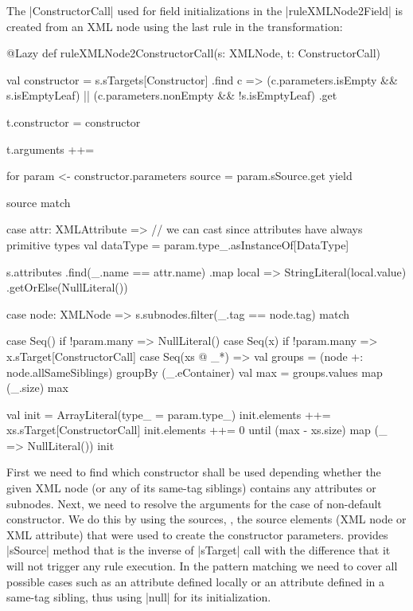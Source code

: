 The \Scala|ConstructorCall| used for field initializations in the \Scala|ruleXMLNode2Field| is created from an XML node using the last rule in the transformation:
%
\begin{scalacode}
@Lazy
def ruleXMLNode2ConstructorCall(s: XMLNode, t: ConstructorCall) {
  val constructor = s.sTargets[Constructor]
    .find { c =>
      (c.parameters.isEmpty && s.isEmptyLeaf) ||
      (c.parameters.nonEmpty && !s.isEmptyLeaf)
    }
    .get

  t.constructor = constructor

  t.arguments ++= {
    for {
      param <- constructor.parameters
      source = param.sSource.get
    } yield {
      source match {
        case attr: XMLAttribute =>
          // we can cast since attributes have always primitive types
          val dataType = param.type_.asInstanceOf[DataType]

          s.attributes
            .find(_.name == attr.name)
            .map { local => StringLiteral(local.value) }
            .getOrElse(NullLiteral())

        case node: XMLNode =>
          s.subnodes.filter(_.tag == node.tag) match {

            case Seq() if !param.many =>
              NullLiteral()
            case Seq(x) if !param.many =>
              x.sTarget[ConstructorCall]
            case Seq(xs @ _*) =>
              val groups = (node +: node.allSameSiblings) groupBy (_.eContainer)
              val max = groups.values map (_.size) max
              
              val init = ArrayLiteral(type_ = param.type_)
              init.elements ++= xs.sTarget[ConstructorCall]
              init.elements ++= 0 until (max - xs.size) map (_ => NullLiteral())
              init
          }
      }
    }
  }
}
\end{scalacode}  

First we need to find which constructor shall be used depending whether the given XML node (or any of its same-tag siblings) contains any attributes or subnodes.
Next, we need to resolve the arguments for the case of non-default constructor.
We do this by using the sources, \Ie, the source elements (XML node or XML attribute) that were used to create the constructor parameters.
\SIGMA provides \Scala|sSource| method that is the inverse of \Scala|sTarget| call with the difference that it will not trigger any rule execution.
In the pattern matching we need to cover all possible cases such as an attribute defined locally or an attribute defined in a same-tag sibling, thus using \Scala|null| for its initialization.

